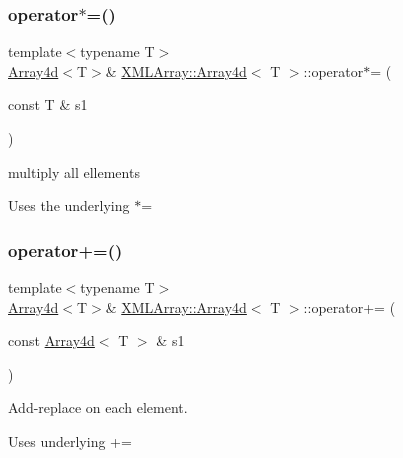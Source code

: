 \subsubsection{\texorpdfstring{operator$\ast$=()}{operator*=()}\hspace{0.1cm}{\footnotesize\ttfamily [4/4]}}
{\footnotesize\ttfamily template$<$typename T$>$ \\
\mbox{\hyperlink{classXMLArray_1_1Array4d}{Array4d}}$<$T$>$\& \mbox{\hyperlink{classXMLArray_1_1Array4d}{X\+M\+L\+Array\+::\+Array4d}}$<$ T $>$\+::operator$\ast$= (\begin{DoxyParamCaption}\item[{const T \&}]{s1 }\end{DoxyParamCaption})\hspace{0.3cm}{\ttfamily [inline]}}



multiply all ellements 

Uses the underlying $\ast$= \mbox{\label{classXMLArray_1_1Array4d_a3ee4e8302e86bcfec817cae81a5fe1bf}} 
\subsubsection{\texorpdfstring{operator+=()}{operator+=()}\hspace{0.1cm}{\footnotesize\ttfamily [1/2]}}
{\footnotesize\ttfamily template$<$typename T$>$ \\
\mbox{\hyperlink{classXMLArray_1_1Array4d}{Array4d}}$<$T$>$\& \mbox{\hyperlink{classXMLArray_1_1Array4d}{X\+M\+L\+Array\+::\+Array4d}}$<$ T $>$\+::operator+= (\begin{DoxyParamCaption}\item[{const \mbox{\hyperlink{classXMLArray_1_1Array4d}{Array4d}}$<$ T $>$ \&}]{s1 }\end{DoxyParamCaption})\hspace{0.3cm}{\ttfamily [inline]}}



Add-\/replace on each element. 

Uses underlying += \mbox{\label{classXMLArray_1_1Array4d_a3ee4e8302e86bcfec817cae81a5fe1bf}} 
